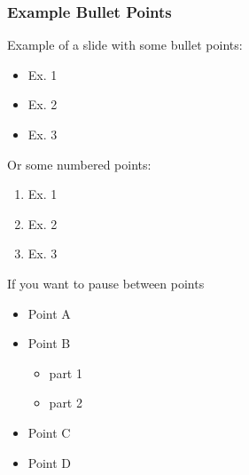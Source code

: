 \begin{frame}
    \frametitle{Example Bullet Points}
    Example of a slide with some bullet points:
    \begin{itemize}
        \item Ex. 1
        \item Ex. 2
        \item Ex. 3
    \end{itemize}
    Or some numbered points:
    \begin{enumerate}
        \item Ex. 1
        \item Ex. 2
        \item Ex. 3
    \end{enumerate}
    If you want to pause between points
    \begin{itemize}
        \pause
        \item Point A
        \pause
        \item Point B
    \begin{itemize}
        \pause
        \item part 1
        \pause
        \item part 2
    \end{itemize}
        \pause
        \item Point C
        \pause
        \item Point D
    \end{itemize}
\end{frame}